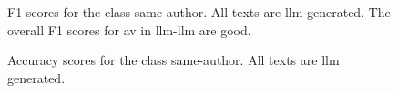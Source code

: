   \begin{figure}[b]
    \centering
    
    \caption{F1 scores for the class same-author.
  All texts are \ac{llm} generated.
  The overall F1 scores for \ac{av} in \ac{llm}-\ac{llm} are good.
  }
    \label{fig:llm-llm_f1}
  \end{figure}

  \begin{figure}[b]
    
  \caption{Accuracy scores for the class same-author.
  All texts are \ac{llm} generated.}
  \label{fig:llm-llm_acc}
\end{figure}